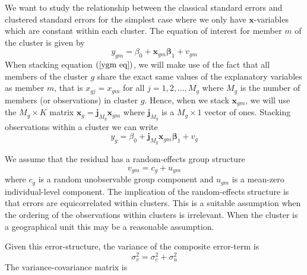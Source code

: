 \documentclass{article}
\begin{document}
We want to study the relationship between the classical standard errors and
clustered standard errors for the simplest case where we only have $\mathbf{x%
}$-variables which are constant within each cluster. The equation of
interest for member $m$ of the cluster is given by%
\begin{equation}
y_{gm}=\beta _{0}+\mathbf{x}_{gm}\mathbf{\beta }_{1}+v_{gm}  \label{ygm eq}
\end{equation}%
When stacking equation $\left( \ref{ygm eq}\right) $, we will make use of
the fact that all members of the cluster $g$ share the exact same values of
the explanatory variables as member $m$, that is $x_{gj}=x_{gm}$ for all $%
j=1,2,...,M_{g}$ where $M_{g}$ is the number of members (or observations) in
cluster $g$. Hence, when we stack $\mathbf{x}_{gm}$, we will use the $%
M_{g}\times K$ matrix $\mathbf{x}_{g}=\mathbf{j}_{M_{g}}\mathbf{x}_{gm}$
where $\mathbf{j}_{M_{g}}$ is a $M_{g}\times 1$ vector of ones. Stacking
observations within a cluster we can write%
\begin{equation*}
y_{g}=\beta _{0}+\mathbf{j}_{M_{g}}\mathbf{x}_{gm}\mathbf{\beta }_{1}+v_{g}
\end{equation*}

We assume that the residual has a random-effects group structure%
\begin{equation*}
v_{gm}=c_{g}+u_{gm}
\end{equation*}%
where $c_{g}$ is a random unobservable group component and $u_{gm}$ is a
mean-zero individual-level component. The implication of the random-effects
structure is that errors are equicorrelated within clusters. This is a
suitable assumption when the ordering of the observations within clusters is
irrelevant. When the cluster is a geographical unit this may be a reasonable
assumption.

Given this error-structure, the variance of the composite error-term is%
\begin{equation*}
\sigma _{v}^{2}=\sigma _{c}^{2}+\sigma _{u}^{2}
\end{equation*}%
The variance-covariance matrix is
\end{document}

